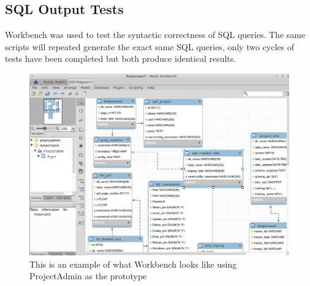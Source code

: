 \documentclass[12pt, svgnames]{article}
\begin{document}
\subsection{SQL Output Tests}
Workbench was used to test the syntactic correctness of SQL queries. The same 
scripts will repeated generate the exact same SQL queries, only two cycles of 
tests have been completed but both produce identical results.\\
\begin{figure}[H]

\includegraphics[width=\textwidth]{workbench_linux}
\caption{This is an example of what Workbench looks like using ProjectAdmin as 
    the prototype}
\end{figure}
\end{document}
